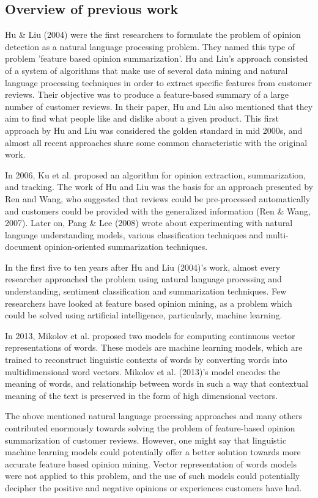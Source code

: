 \documentclass{sig-alternate}
\begin{document}
\subsection{Overview of previous work}
Hu \& Liu (2004) were the first researchers to formulate the problem of opinion detection as a natural language processing problem. They named this type of problem 'feature based opinion summarization'. Hu and Liu's approach consisted of a system of algorithms that make use of several data mining and natural language processing techniques in order to extract specific features from customer reviews. Their objective was to produce a feature-based summary of a large number of customer reviews. In their paper, Hu and Liu also mentioned that they aim to find what people like and dislike about a given product. This first approach by Hu and Liu was considered the golden standard in mid 2000s, and almost all recent approaches share some common characteristic with the original work. 

In 2006, Ku et al. proposed an algorithm for opinion extraction, summarization, and tracking. The work of Hu and Liu was the basis for an approach presented by Ren and Wang, who suggested that reviews could be pre-processed automatically and customers could be provided with the generalized information (Ren \& Wang, 2007). Later on, Pang \& Lee (2008) wrote about experimenting with natural language understanding models, various classification techniques and multi-document opinion-oriented summarization techniques. 

In the first five to ten years after Hu and Liu (2004)'s work, almost every researcher approached the problem using natural language processing and understanding, sentiment classification and summarization techniques. Few researchers have looked at feature based opinion mining, as a problem which could be solved using artificial intelligence, particularly, machine learning.

In 2013, Mikolov et al. proposed two models for computing continuous vector representations of words. These models are machine learning models, which are trained to reconstruct linguistic contexts of words by converting words into multidimensional word vectors. Mikolov et al. (2013)'s model encodes the meaning of words, and relationship between words in such a way that contextual meaning of the text is preserved in the form of high dimensional vectors.

The above mentioned natural language processing approaches and many others contributed enormously towards solving the problem of feature-based opinion summarization of customer reviews. However, one might say that linguistic machine learning models could potentially offer a better solution towards more accurate feature based opinion mining. Vector representation of words models were not applied to this problem, and the use of such models could potentially decipher the positive and negative opinions or experiences customers have had.
\end{document}
